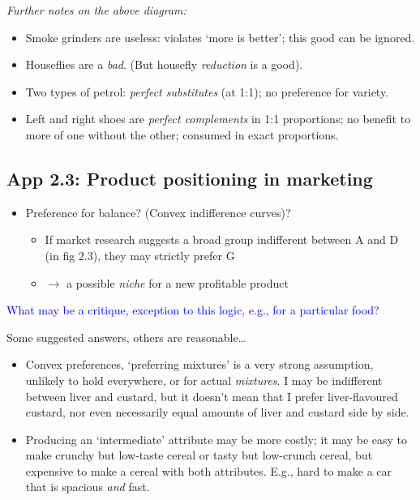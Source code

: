 \documentclass[]{article}
\providecommand{\tightlist}{%
  \setlength{\itemsep}{0pt}\setlength{\parskip}{0pt}}
\begin{document}
\emph{Further notes on the above diagram:}

\begin{itemize}
\item
  Smoke grinders are useless: violates `more is better'; this good can be ignored.
\item
  Houseflies are a \emph{bad}. (But housefly \emph{reduction} is a good).
\item
  Two types of petrol: \emph{perfect substitutes} (at 1:1); no preference for variety.
\item
  Left and right shoes are \emph{perfect complements} in 1:1 proportions; no benefit to more of one without the other; consumed in exact proportions.
\end{itemize}

\hypertarget{app-2.3-product-positioning-in-marketing}{%
\subsection{App 2.3: Product positioning in marketing}\label{app-2.3-product-positioning-in-marketing}}

\begin{itemize}
\tightlist
\item
  Preference for balance? (Convex indifference curves)?

  \begin{itemize}
  \tightlist
  \item
    If market research suggests a broad group indifferent between A and D (in fig 2.3), they may strictly prefer G
  \item
    \(\rightarrow\) a possible \emph{niche} for a new profitable product
  \end{itemize}
\end{itemize}

\textcolor{blue}{What may be a critique, exception to this logic, e.g., for a particular food?}

Some suggested answers, others are reasonable\ldots{}

\begin{itemize}
\item
  Convex preferences, `preferring mixtures' is a very strong assumption, unlikely to hold everywhere, or for actual \emph{mixtures}. I may be indifferent between liver and custard, but it doesn't mean that I prefer liver-flavoured custard, nor even necessarily equal amounts of liver and custard side by side.
\item
  Producing an `intermediate' attribute may be more costly; it may be easy to make crunchy but low-taste cereal or tasty but low-crunch cereal, but expensive to make a cereal with both attributes. E.g., hard to make a car that is spacious \emph{and} fast.
\end{itemize}
\end{document}
